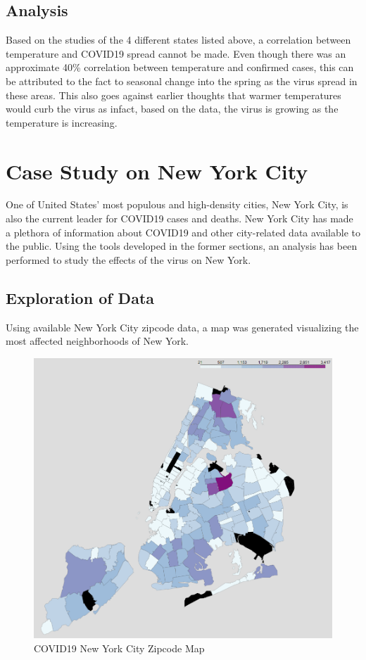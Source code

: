 \documentclass{homework}
\begin{document}
\subsection{Analysis}

Based on the studies of the 4 different states listed above, a correlation between temperature and COVID19 spread cannot be made. Even though there was an approximate 40\% correlation between temperature and confirmed cases, this can be attributed to the fact to seasonal change into the spring as the virus spread in these areas. This also goes against earlier thoughts that warmer temperatures would curb the virus as infact, based on the data, the virus is growing as the temperature is increasing.

\newpage
\section{Case Study on New York City}

One of United States' most populous and high-density cities, New York City, is also the current leader for COVID19 cases and deaths. New York City has made a plethora of information about COVID19 and other city-related data available to the public. Using the tools developed in the former sections, an analysis has been performed to study the effects of the virus on New York. 

\subsection{Exploration of Data}

Using available New York City zipcode data, a map was generated visualizing the most affected neighborhoods of New York.

\begin{figure}[H]
  \centering
  \includegraphics[scale=0.3]{task5/map.PNG}
  \caption{COVID19 New York City Zipcode Map}
\end{figure}
\end{document}
